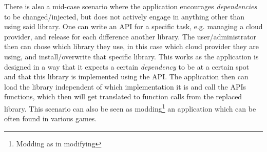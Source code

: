 There is also a mid-case scenario where the application encourages \textit{dependencies} to be changed/injected, but does not actively engage in anything other than using said library.
One can write an API for a specific task, e.g. managing a cloud provider, and release for each difference another library.
The user/administrator then can chose which library they use, in this case which cloud provider they are using, and install/overwrite that specific library.
This works as the application is designed in a way that it expects a certain \textit{dependency} to be at a certain spot and that this library is implemented using the API.
The application then can load the library independent of which implementation it is and call the APIs functions, which then will get translated to function calls from the replaced library.
This scenario can also be seen as modding\footnote{Modding as in modifying} an application which can be often found in various games.



